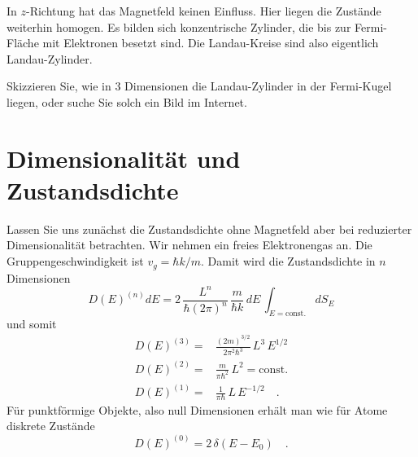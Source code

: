 In $z$-Richtung hat das Magnetfeld keinen Einfluss. Hier liegen die Zustände weiterhin homogen. Es bilden sich  konzentrische Zylinder, die bis zur Fermi-Fläche mit Elektronen besetzt sind. Die Landau-Kreise sind also eigentlich Landau-Zylinder.


\begin{questions}
   \item Skizzieren Sie, wie in 3 Dimensionen die Landau-Zylinder in der Fermi-Kugel liegen, oder suche Sie solch ein Bild im Internet.
\end{questions}

\section{Dimensionalität und Zustandsdichte}


Lassen Sie uns zunächst die Zustandsdichte ohne Magnetfeld aber bei reduzierter Dimensionalität betrachten. Wir nehmen ein freies Elektronengas an. Die Gruppengeschwindigkeit ist $v_g = \hbar k / m$. Damit wird die  Zustandsdichte in $n$ Dimensionen 
\begin{equation}
    D(E)^{(n)} dE = 2 \, \frac{L^n}{\hbar (2 \pi)^n} \, \frac{m}{\hbar k} \,  dE \, \int_{E = \text{const.}} d S_E 
\end{equation}
und somit
\begin{eqnarray}
   D(E)^{(3)} = &  \frac{(2m)^{3/2}}{2 \pi^2 \hbar^3} \, L^3 \,  E^{1/2}  \\
   D(E)^{(2)} = &  \frac{m}{\pi \hbar^2} \, L^2   = \text{const.} \\
   D(E)^{(1)} = &  \frac{1}{\pi \hbar} \, L \, E^{-1/2}    \quad .
\end{eqnarray}
Für punktförmige Objekte, also null Dimensionen erhält man wie für Atome diskrete Zustände
\begin{equation}
   D(E)^{(0)} =  2 \, \delta(E-E_0) \quad .
\end{equation}

